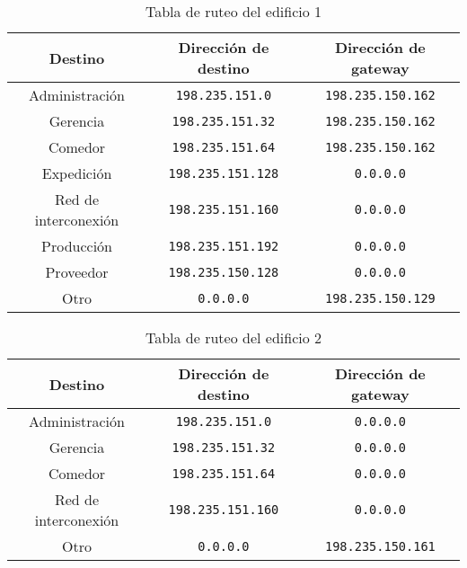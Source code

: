\begin{table}[H]
    \centering
    \begin{tabular}{c|c|c}
        \textbf{Destino} & \textbf{Dirección de destino} & \textbf{Dirección de gateway} \\
        \hline
        \small Administración & \small\texttt{198.235.151.0} & \small\texttt{198.235.150.162} \\ 
        \small Gerencia & \small\texttt{198.235.151.32} & \small\texttt{198.235.150.162} \\ 
        \small Comedor & \small\texttt{198.235.151.64} & \small\texttt{198.235.150.162} \\
        \small Expedición & \small\texttt{198.235.151.128} & \small\texttt{0.0.0.0} \\
        \small Red de interconexión & \small\texttt{198.235.151.160} & \small\texttt{0.0.0.0} \\
        \small Producción & \small\texttt{198.235.151.192} & \small\texttt{0.0.0.0} \\
        \small Proveedor & \small\texttt{198.235.150.128} & \small\texttt{0.0.0.0} \\
        \small Otro & \small\texttt{0.0.0.0} & \small\texttt{198.235.150.129} \\  
    \end{tabular}
    \caption{Tabla de ruteo del edificio 1\\}
    \label{tabla_edif1}
\end{table}

\begin{table}[H]
    \centering
    \begin{tabular}{c|c|c}
        \textbf{Destino} & \textbf{Dirección de destino} & \textbf{Dirección de gateway} \\
        \hline 
        \small Administración & \small\texttt{198.235.151.0} & \small\texttt{0.0.0.0} \\ 
        \small Gerencia & \small\texttt{198.235.151.32} & \small\texttt{0.0.0.0} \\ 
        \small Comedor & \small\texttt{198.235.151.64} & \small\texttt{0.0.0.0} \\  
        \small Red de interconexión & \small\texttt{198.235.151.160} & \small\texttt{0.0.0.0} \\
        \small Otro & \small\texttt{0.0.0.0} & \small\texttt{198.235.150.161} \\
    \end{tabular}
    \caption{Tabla de ruteo del edificio 2\\}
    \label{tabla_edif2}
\end{table}
